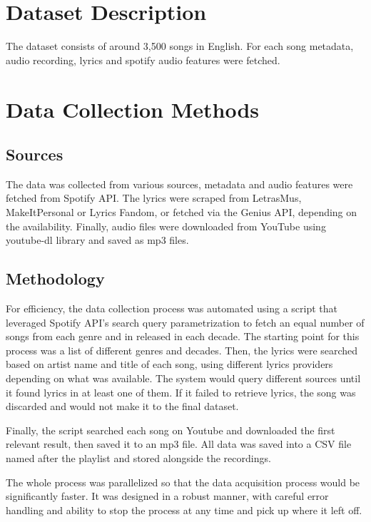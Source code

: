 \section{Dataset Description}
\label{sec:datasetdescription}

The dataset consists of around 3,500 songs in English. For each song metadata, audio
recording, lyrics and spotify audio features were fetched.

\section{Data Collection Methods}
\label{sec:datacollectionmethods}

\subsection{Sources}
The data was collected from various sources, metadata and audio features were
fetched from Spotify API. The lyrics were scraped from LetrasMus,
MakeItPersonal or Lyrics Fandom, or fetched via the Genius API, depending on
the availability. Finally, audio files were downloaded from YouTube using
youtube-dl library and saved as mp3
files.\cite{spotify_api,makeitpersonal,genius,letras_mus,lyricsfandom,ytdl} 

\subsection{Methodology}
For efficiency, the data collection process was automated using a script that
leveraged Spotify API’s search query parametrization to fetch an equal number
of songs from each genre and in released in each decade. The starting point for
this process was a list of different genres and decades. Then, the lyrics were
searched based on artist name and title of each song, using different lyrics
providers depending on what was available. The system would query different
sources until it found lyrics in at least one of them. If it failed to retrieve
lyrics, the song was discarded and would not make it to the final dataset.


Finally, the script searched each song on Youtube  and downloaded the first
relevant result, then saved it to an mp3 file. All data was saved into a CSV
file named after the playlist and stored alongside the recordings. 

The whole process was parallelized so that the data acquisition process would
be significantly faster. It was designed in a robust manner, with careful error
handling and ability to stop the process at any time and pick up where it left
off.


